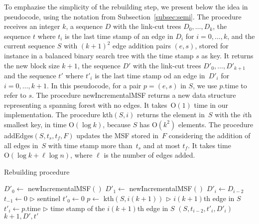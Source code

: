 \documentclass[reqno,11pt]{amsart}
\newcommand{\Oh}{\mathrm{O}}
\begin{document}
\medskip

To emphazise the simplicity of the rebuilding step, we present below 
the idea in pseudocode, using the notation from Subsection~\ref{subsec:semi}.
The procedure receives an integer $k$, a sequence $D$ with the link-cut trees $D_0,\ldots,D_k$, 
the sequence $t$ where $t_i$ is the last time stamp of an edge in $D_i$ for $i=0,\ldots,k$, and
the current sequence $S$ with $(k+1)^2$ edge addition pairs $(e,s)$, stored 
for instance in a balanced binary search tree with the time stamp $s$ as key.
It returns the new block size $k+1$, the sequence $D'$ with 
the link-cut trees $D'_0,\ldots,D'_{k+1}$ and the sequence $t'$ 
where $t'_i$ is the last time stamp od an edge in~$D'_i$ for $i=0,\ldots,k+1$. 
In this pseudocode, for a pair $p=(e,s)$ in $S$, we use 
$p.\textrm{time}$ to refer to $s$. %
The procedure {\sc newIncrementalMSF} returns 
a new data structure representing a spanning forest with no edges. 
It takes~$\Oh(1)$ time in our implementation. 
The procedure {\sc kth}$(S,i)$ returns the element in~$S$ with the $i$th smallest key, 
in time $\Oh(\log k)$, because $S$ has $\Oh(k^2)$ elements. 
The procedure {\sc addEdges}$(S,t_s,t_f,F)$ updates the MSF stored in~$F$ 
considering the addition of all edges in~$S$ with time stamp more than~$t_s$ 
and at most $t_f$.
It takes time $\Oh(\log k + \ell\log n)$, where $\ell$ is the number of edges added.

\medskip

\begin{algorithm}[h!]
    \caption{Rebuilding procedure}\label{rmsf-build-decomp}
    \begin{algorithmic}[1]
        \State $D'_0 \gets$ {\sc newIncrementalMSF}$()$
        \State $D'_1 \gets$ {\sc newIncrementalMSF}$()$
        \State $D'_i \gets D_{i-2}$
        \EndFor
        \State $t_{-1} \gets 0$ \hfill {\footnotesize $\rhd$ sentinel}
        \State $t'_0 \gets 0$ 
        \State $p \gets$ {\sc kth}$(S,i(k+1))$ \hfill {\footnotesize $\rhd$ $i(k+1)$th edge in $S$}
        \State $t'_i \gets p.\textrm{time}$ \hfill {\footnotesize $\rhd$ time stamp of the $i(k+1)$th edge in $S$}
        $(S,t_{i-2},t'_i,D'_i)$
        \EndFor
        \State \Return $k+1,D',t'$
        \EndFunction
    \end{algorithmic}
\end{algorithm}
\end{document}
